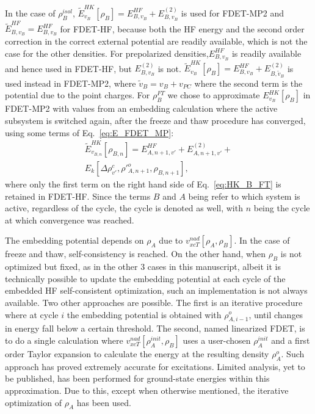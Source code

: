\documentclass[journal=jctcce,manuscript=article, layout=twocolumn]{achemso}
\begin{document}
 In the case of $\rho_B^{isol}$, $\tilde{E}^{HK}_{v_B}[\rho_B] = E^{HF}_{B,v_B} + E^{(2)}_{B,v_B}$ is used for FDET-MP2 and $\tilde{E}^{HF}_{B,v_B} = E^{HF}_{B,v_B}$ for FDET-HF, because both the HF energy and the second order correction in the correct external potential are readily available, which is not the case for the other densities. For prepolarized densities,$E^{HF}_{B,v_B}$ is readily available and hence used in FDET-HF, but $E^{(2)}_{B,v_B}$ is not. $\tilde{E}^{HK}_{v_B}[\rho_B] = E^{HF}_{B,v_B} + E^{(2)}_{B,\tilde{v}_B}$ is used instead in FDET-MP2, where $\tilde{v}_B = v_B + v_{PC}$ where the second term is the potential due to the point charges.
 For $\rho_B^{FT}$ we chose to approximate $E^{HK}_{v_B}[\rho_B]$ in FDET-MP2 with values from an embedding calculation where the active subsystem is switched again, after the freeze and thaw procedure has converged, using some terms of Eq.~\ref{eq:E_FDET_MP}:
\begin{align} \label{eq:HK_B_FT}
 \tilde{E}^{HK}_{v_{B,n}}[\rho_{B,n}] = E^{HF}_{A,n+1,v'} + E^{(2)}_{A,n+1,v'} + \\ \nonumber
 E_k[\Delta \rho^c_{v'}, \rho'^{o}_{A,n+1}, \rho_{B,n+1}],
\end{align}
where only the first term on the right hand side of Eq.~\ref{eq:HK_B_FT} is retained in FDET-HF.
Since the terms $B$ and $A$ being refer to which system is active, regardless of the cycle, the cycle is denoted as well, with $n$ being the cycle at which convergence was reached.

The embedding potential depends on $\rho_A$ due to $v_{xcT}^{nad}[\rho_A, \rho_B]$. In the case of freeze and thaw, self-consistency is reached. On the other hand, when $\rho_B$ is not optimized but fixed, as in the other 3 cases in this manuscript, albeit it is technically possible to update the embedding potential at each cycle of the embedded HF self-consistent optimization\cite{Dulak2009}, such an implementation is not always available. Two other approaches are possible.  The first is an iterative procedure where at cycle $i$ the embedding potential is obtained with $\rho^o_{A,i-1}$, until changes in energy fall below a certain threshold. The second, named linearized FDET, is to do a single calculation where $v_{xcT}^{nad}[\rho_A^{init}, \rho_B]$ uses a user-chosen $\rho_A^{init}$ and a first order Taylor expansion to calculate the energy at the resulting density $\rho^{o}_A$. Such approach has proved extremely accurate for excitations\cite{Zech2015}. Limited analysis, yet to be published, has been performed for ground-state energies within this approximation. Due to this, except when otherwise mentioned, the iterative optimization of $\rho_A$ has been used.
\end{document}
